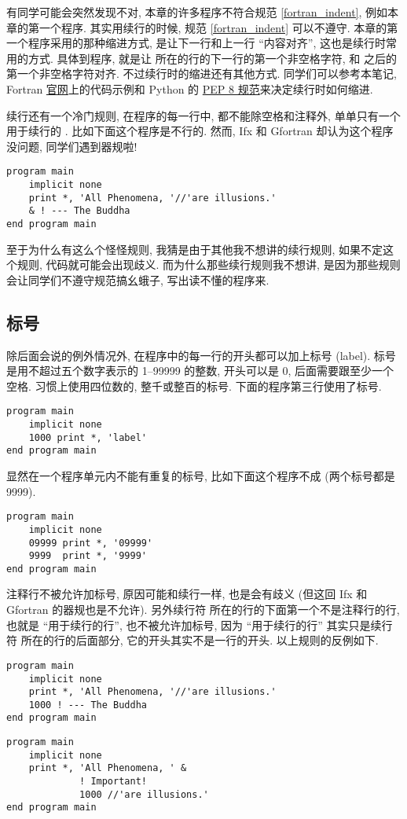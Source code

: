 有同学可能会突然发现不对, 本章的许多程序不符合规范 \ref{fortran_indent}, 例如本章的第一个程序. 其实用续行的时候, 规范 \ref{fortran_indent} 可以不遵守. 本章的第一个程序采用的那种缩进方式, 是让下一行和上一行 ``内容对齐'', 这也是续行时常用的方式. 具体到程序, 就是让 \ttt{*,} 所在的行的下一行的第一个非空格字符, 和 \ttt{*,} 之后的第一个非空格字符对齐. 不过续行时的缩进还有其他方式. 同学们可以参考本笔记,  Fortran \href{https://fortran-lang.org/}{官网}上的代码示例和 Python 的 \href{https://peps.python.org/pep-0008/}{PEP 8 规范}来决定续行时如何缩进.

续行还有一个冷门规则, 在程序的每一行中, 都不能除空格和注释外, 单单只有一个用于续行的 \ttt{\&{}}. 比如下面这个程序是不行的. 然而, Ifx 和 Gfortran 却认为这个程序没问题, 同学们遇到器规啦!
\begin{lstlisting}
program main
    implicit none
    print *, 'All Phenomena, '//'are illusions.'
    & ! --- The Buddha
end program main
\end{lstlisting}
至于为什么有这么个怪怪规则, 我猜是由于其他我不想讲的续行规则, 如果不定这个规则, 代码就可能会出现歧义. 而为什么那些续行规则我不想讲, 是因为那些规则会让同学们不遵守规范搞幺蛾子, 写出读不懂的程序来.

\subsection{标号}

除后面会说的例外情况外, 在程序中的每一行的开头都可以加上标号 (label). 标号是用不超过五个数字表示的 1--99999 的整数, 开头可以是 0, 后面需要跟至少一个空格. 习惯上使用四位数的, 整千或整百的标号. 下面的程序第三行使用了标号.
\begin{lstlisting}
program main
    implicit none
    1000 print *, 'label'
end program main
\end{lstlisting}

显然在一个程序单元内不能有重复的标号, 比如下面这个程序不成 (两个标号都是 9999).
\begin{lstlisting}
program main
    implicit none
    09999 print *, '09999'
    9999  print *, '9999'
end program main
\end{lstlisting}

注释行不被允许加标号, 原因可能和续行一样, 也是会有歧义 (但这回 Ifx 和 Gfortran 的器规也是不允许). 另外续行符 \ttt{\&{}} 所在的行的下面第一个不是注释行的行, 也就是 ``用于续行的行'', 也不被允许加标号, 因为 ``用于续行的行'' 其实只是续行符 \ttt{\&{}} 所在的行的后面部分, 它的开头其实不是一行的开头. 以上规则的反例如下.
\begin{lstlisting}
program main
    implicit none
    print *, 'All Phenomena, '//'are illusions.'
    1000 ! --- The Buddha
end program main
\end{lstlisting}
\begin{lstlisting}
program main
    implicit none
    print *, 'All Phenomena, ' &
             ! Important!
             1000 //'are illusions.'
end program main
\end{lstlisting}

